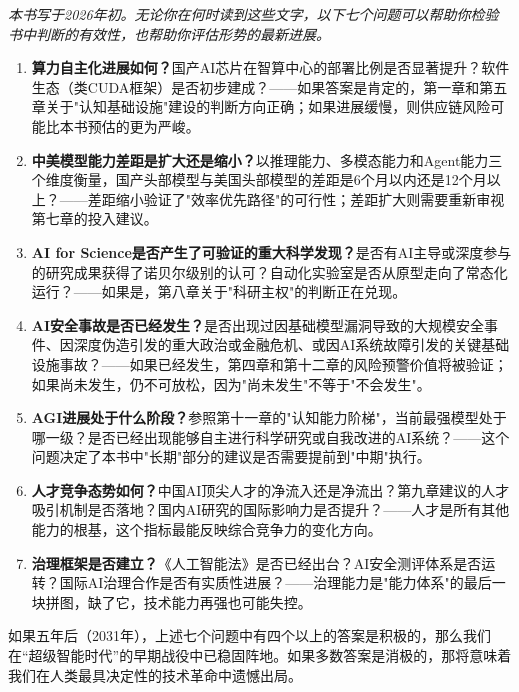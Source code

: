 \textit{本书写于2026年初。无论你在何时读到这些文字，以下七个问题可以帮助你检验书中判断的有效性，也帮助你评估形势的最新进展。}
\begin{enumerate}
    \item \textbf{算力自主化进展如何？}国产AI芯片在智算中心的部署比例是否显著提升？软件生态（类CUDA框架）是否初步建成？——如果答案是肯定的，第一章和第五章关于"认知基础设施"建设的判断方向正确；如果进展缓慢，则供应链风险可能比本书预估的更为严峻。
    
    \item \textbf{中美模型能力差距是扩大还是缩小？}以推理能力、多模态能力和Agent能力三个维度衡量，国产头部模型与美国头部模型的差距是6个月以内还是12个月以上？——差距缩小验证了"效率优先路径"的可行性；差距扩大则需要重新审视第七章的投入建议。
    
    \item \textbf{AI for Science是否产生了可验证的重大科学发现？}是否有AI主导或深度参与的研究成果获得了诺贝尔级别的认可？自动化实验室是否从原型走向了常态化运行？——如果是，第八章关于"科研主权"的判断正在兑现。
    
    \item \textbf{AI安全事故是否已经发生？}是否出现过因基础模型漏洞导致的大规模安全事件、因深度伪造引发的重大政治或金融危机、或因AI系统故障引发的关键基础设施事故？——如果已经发生，第四章和第十二章的风险预警价值将被验证；如果尚未发生，仍不可放松，因为"尚未发生"不等于"不会发生"。
    
    \item \textbf{AGI进展处于什么阶段？}参照第十一章的"认知能力阶梯"，当前最强模型处于哪一级？是否已经出现能够自主进行科学研究或自我改进的AI系统？——这个问题决定了本书中"长期"部分的建议是否需要提前到"中期"执行。
    
    \item \textbf{人才竞争态势如何？}中国AI顶尖人才的净流入还是净流出？第九章建议的人才吸引机制是否落地？国内AI研究的国际影响力是否提升？——人才是所有其他能力的根基，这个指标最能反映综合竞争力的变化方向。
    
    \item \textbf{治理框架是否建立？}《人工智能法》是否已经出台？AI安全测评体系是否运转？国际AI治理合作是否有实质性进展？——治理能力是"能力体系"的最后一块拼图，缺了它，技术能力再强也可能失控。
\end{enumerate}

\noindent 如果五年后（2031年），上述七个问题中有四个以上的答案是积极的，那么我们在“超级智能时代”的早期战役中已稳固阵地。如果多数答案是消极的，那将意味着我们在人类最具决定性的技术革命中遗憾出局。

